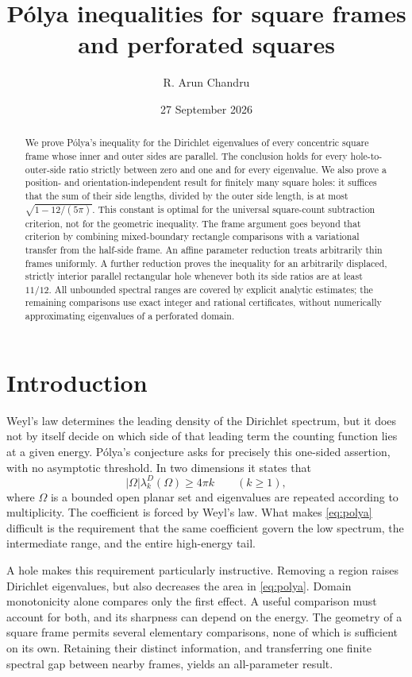 \documentclass[11pt,reqno]{amsart}
\title[P\'olya inequalities for square frames]{P\'olya inequalities for square frames\texorpdfstring{\\}{ }and perforated squares}
\author{R. Arun Chandru}
\date{27 September 2026}
\numberwithin{equation}{section}
\newcommand{\abs}[1]{\lvert#1\rvert}
\newcommand{\Om}{\Omega}
\begin{document}
\begin{abstract}
We prove P\'olya's inequality for the Dirichlet eigenvalues of every
concentric square frame whose inner and outer sides are parallel.
The conclusion holds for every hole-to-outer-side ratio strictly between
zero and one and for every eigenvalue. We also prove a position- and
orientation-independent result for finitely many square holes: it suffices
that the sum of their side lengths, divided by the outer side length,
is at most $\sqrt{1-12/(5\pi)}$. This constant is optimal for the
universal square-count subtraction criterion, not for the geometric
inequality. The frame argument goes beyond that criterion by combining
mixed-boundary rectangle comparisons with a variational transfer from
the half-side frame. An affine parameter reduction treats arbitrarily
thin frames uniformly. A further reduction proves the inequality for
an arbitrarily displaced, strictly interior parallel rectangular hole
whenever both its side ratios are at least $11/12$. All unbounded
spectral ranges are covered by
explicit analytic estimates; the remaining comparisons use exact
integer and rational certificates, without numerically approximating eigenvalues of a perforated domain.
\end{abstract}
\maketitle
\tableofcontents

\section{Introduction}\label{sec:introduction}

Weyl's law determines the leading density of the Dirichlet spectrum,
but it does not by itself decide on which side of that leading term
the counting function lies at a given energy. P\'olya's conjecture asks
for precisely this one-sided assertion, with no asymptotic threshold.
In two dimensions it states that
\begin{equation}\label{eq:polya}
 \abs\Om\lambda_k^D(\Om)\ge4\pi k\qquad(k\ge1),
\end{equation}
where $\Om$ is a bounded open planar set and eigenvalues are repeated
according to multiplicity. The coefficient is forced by Weyl's law.
What makes \eqref{eq:polya} difficult is the requirement that the same
coefficient govern the low spectrum, the intermediate range, and the
entire high-energy tail.

A hole makes this requirement particularly instructive. Removing a
region raises Dirichlet eigenvalues, but also decreases the area in
\eqref{eq:polya}. Domain monotonicity alone compares only the first
effect. A useful comparison must account for both, and its sharpness
can depend on the energy. The geometry of a square frame permits
several elementary comparisons, none of which is sufficient on its
own. Retaining their distinct information, and transferring one
finite spectral gap between nearby frames, yields an all-parameter
result.
\end{document}

